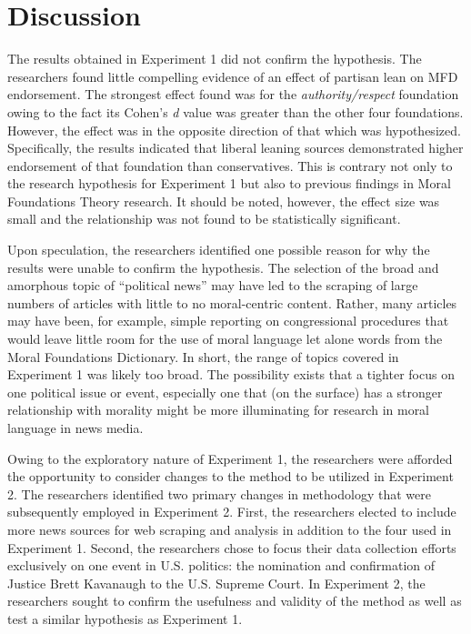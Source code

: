 \documentclass[,man]{apa6}
\begin{document}
\hypertarget{discussion}{%
\section{Discussion}\label{discussion}}

The results obtained in Experiment 1 did not confirm the hypothesis. The researchers found little compelling evidence of an effect of partisan lean on MFD endorsement. The strongest effect found was for the \emph{authority/respect} foundation owing to the fact its Cohen's \emph{d} value was greater than the other four foundations. However, the effect was in the opposite direction of that which was hypothesized. Specifically, the results indicated that liberal leaning sources demonstrated higher endorsement of that foundation than conservatives. This is contrary not only to the research hypothesis for Experiment 1 but also to previous findings in Moral Foundations Theory research. It should be noted, however, the effect size was small and the relationship was not found to be statistically significant.

Upon speculation, the researchers identified one possible reason for why the results were unable to confirm the hypothesis. The selection of the broad and amorphous topic of \enquote{political news} may have led to the scraping of large numbers of articles with little to no moral-centric content. Rather, many articles may have been, for example, simple reporting on congressional procedures that would leave little room for the use of moral language let alone words from the Moral Foundations Dictionary. In short, the range of topics covered in Experiment 1 was likely too broad. The possibility exists that a tighter focus on one political issue or event, especially one that (on the surface) has a stronger relationship with morality might be more illuminating for research in moral language in news media.

Owing to the exploratory nature of Experiment 1, the researchers were afforded the opportunity to consider changes to the method to be utilized in Experiment 2. The researchers identified two primary changes in methodology that were subsequently employed in Experiment 2. First, the researchers elected to include more news sources for web scraping and analysis in addition to the four used in Experiment 1. Second, the researchers chose to focus their data collection efforts exclusively on one event in U.S. politics: the nomination and confirmation of Justice Brett Kavanaugh to the U.S. Supreme Court. In Experiment 2, the researchers sought to confirm the usefulness and validity of the method as well as test a similar hypothesis as Experiment 1.
\end{document}

